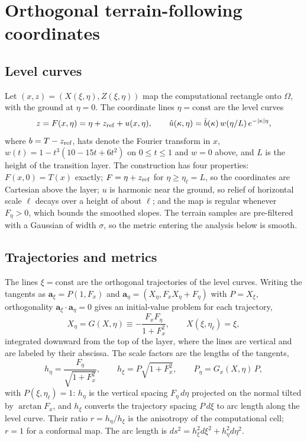 \documentclass[11pt]{article}
\newcommand{\etal}{\eta_{\ell}}
\begin{document}
\section{Orthogonal terrain-following coordinates}\label{sec:map}

\subsection{Level curves}
Let $(x,z)=(X(\xi,\eta),Z(\xi,\eta))$ map the computational rectangle onto
$\Omega$, with the ground at $\eta=0$. The coordinate lines $\eta=\text{const}$
are the level curves
\begin{equation}\label{eq:family}
z=F(x,\eta)=\eta+z_{\rm ref}+u(x,\eta),\qquad
\hat u(\kappa,\eta)=\hat b(\kappa)\,w(\eta/L)\,e^{-|\kappa|\eta},
\end{equation}
where $b=T-z_{\rm ref}$, hats denote the Fourier transform in $x$,
$w(t)=1-t^3(10-15t+6t^2)$ on $0\le t\le1$ and $w=0$ above, and $L$ is the
height of the transition layer. The construction has four properties:
$F(x,0)=T(x)$ exactly; $F=\eta+z_{\rm ref}$ for $\eta\ge\etal=L$, so the
coordinates are Cartesian above the layer; $u$ is harmonic near the ground, so
relief of horizontal scale $\ell$ decays over a height of about $\ell$; and
the map is regular whenever $F_\eta>0$, which bounds the smoothed slopes. The
terrain samples are pre-filtered with a Gaussian of width $\sigma$, so the
metric entering the analysis below is smooth.

\subsection{Trajectories and metrics}
The lines $\xi=\text{const}$ are the orthogonal trajectories of the level
curves. Writing the tangents as $\mathbf a_\xi=P(1,F_x)$ and
$\mathbf a_\eta=(X_\eta,F_xX_\eta+F_\eta)$ with $P=X_\xi$, orthogonality
$\mathbf a_\xi\cdot\mathbf a_\eta=0$ gives an initial-value problem for each
trajectory,
\begin{equation}\label{eq:traj}
X_\eta=G(X,\eta)\equiv-\frac{F_xF_\eta}{1+F_x^2},\qquad
X(\xi,\etal)=\xi ,
\end{equation}
integrated downward from the top of the layer, where the lines are vertical
and are labeled by their abscissa. The scale factors are the lengths of the
tangents,
\begin{equation}\label{eq:metric}
h_\eta=\frac{F_\eta}{\sqrt{1+F_x^2}},\qquad
h_\xi=P\sqrt{1+F_x^2},\qquad
P_\eta=G_x(X,\eta)\,P ,
\end{equation}
with $P(\xi,\etal)=1$: $h_\eta$ is the vertical spacing $F_\eta\,d\eta$
projected on the normal tilted by $\arctan F_x$, and $h_\xi$ converts the
trajectory spacing $P\,d\xi$ to arc length along the level curve. Their ratio
$r=h_\eta/h_\xi$ is the anisotropy of the computational cell; $r=1$ for a
conformal map. The arc length is $ds^2=h_\xi^2d\xi^2+h_\eta^2d\eta^2$.
\end{document}
